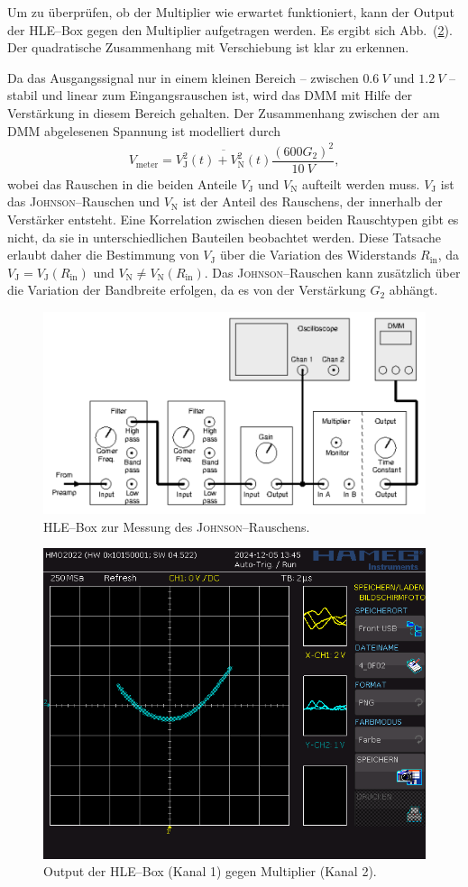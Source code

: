 \documentclass[sn-mathphys-num,iicol]{sn-jnl}
\theoremstyle{thmstyleone}
\theoremstyle{thmstyletwo}
\theoremstyle{thmstylethree}
\begin{document}
Um zu überprüfen, ob der Multiplier wie erwartet funktioniert, kann der Output der HLE--Box gegen den Multiplier aufgetragen werden.
Es ergibt sich Abb.\ (\ref{fig:multiplier}).
Der quadratische Zusammenhang mit Verschiebung ist klar zu erkennen.

Da das Ausgangssignal nur in einem kleinen Bereich -- zwischen $\SI{0.6}{V}$ und $\SI{1.2}{V}$ -- stabil und linear zum Eingangsrauschen ist, wird das DMM mit Hilfe der Verstärkung in diesem Bereich gehalten.
Der Zusammenhang zwischen der am DMM abgelesenen Spannung ist modelliert durch
\begin{align}
	V_\text{meter}=\overline{V_\text{J}^2(t)+V_\text{N}^2(t)}\dfrac{\left(600G_2\right)^2}{\SI{10}{V}}
	,\end{align}
wobei das Rauschen in die beiden Anteile $V_\text{J}$ und $V_\text{N}$ aufteilt werden muss.
$V_\text{J}$ ist das \textsc{Johnson}--Rauschen und $V_\text{N}$ ist der Anteil des Rauschens, der innerhalb der Verstärker entsteht.
Eine Korrelation zwischen diesen beiden Rauschtypen gibt es nicht, da sie in unterschiedlichen Bauteilen beobachtet werden.
Diese Tatsache erlaubt daher die Bestimmung von $V_\text{J}$ über die Variation des Widerstands $R_\text{in}$, da $V_\text{J}=V_\text{J}(R_\text{in})$ und $V_\text{N}\neq V_\text{N}(R_\text{in})$.
Das \textsc{Johnson}--Rauschen kann zusätzlich über die Variation der Bandbreite erfolgen, da es von der Verstärkung $G_2$ abhängt.

\begin{figure}[t]
	\centering
	\includegraphics[width=.5\textwidth]{425_schaltplan_messung_johnson.png}
	\caption{HLE--Box zur Messung des \textsc{Johnson}--Rauschens.\cite{anleitung425}} \label{fig:johnson_hle_messung}
\end{figure}

\begin{figure}[t]
	\centering
	\includegraphics[width=.5\textwidth]{../data/4_0F02.png}
	\caption{Output der HLE--Box (Kanal 1) gegen Multiplier (Kanal 2).} \label{fig:multiplier}
\end{figure}
\end{document}
